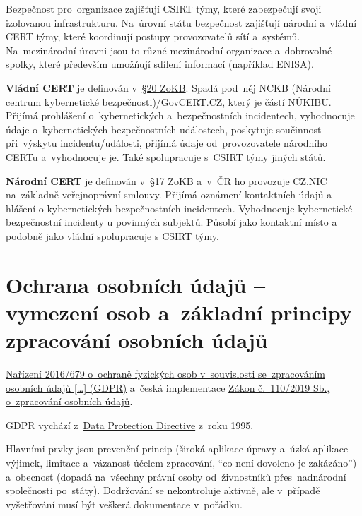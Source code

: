 Bezpečnost pro~organizace zajišťují CSIRT týmy, které zabezpečují svoji izolovanou infrastrukturu. Na~úrovní státu bezpečnost zajišťují národní a~vládní CERT týmy, které koordinují postupy provozovatelů sítí a~systémů. Na~mezinárodní úrovni jsou to různé mezinárodní organizace a~dobrovolné spolky, které především umožňují sdílení informací (například ENISA).

\textbf{Vládní CERT} je definován v~\href{https://www.zakonyprolidi.cz/cs/2014-181#p20}{§20 ZoKB}. Spadá pod~něj NCKB (Národní centrum kybernetické bezpečnosti)/GovCERT.CZ, který je částí NÚKIBU. Přijímá prohlášení o~kybernetických a~bezpečnostních incidentech, vyhodnocuje údaje o~kybernetických bezpečnostních událostech, poskytuje součinnost při~výskytu incidentu/události, přijímá údaje od~provozovatele národního CERTu a~vyhodnocuje je. Také spolupracuje s~CSIRT týmy jiných států.

\textbf{Národní CERT} je definován v~\href{https://www.zakonyprolidi.cz/cs/2014-181#p17}{§17 ZoKB} a~v~ČR ho provozuje CZ.NIC na~základně veřejnoprávní smlouvy. Přijímá oznámení kontaktních údajů a hlášení o kybernetických bezpečnostních incidentech. Vyhodnocuje kybernetické bezpečnostní incidenty u povinných subjektů. Působí jako kontaktní místo a podobně jako vládní spolupracuje s CSIRT týmy.







\clearpage
\section{Ochrana osobních údajů -- vymezení osob a~základní principy zpracování osobních údajů}

\href{https://eur-lex.europa.eu/legal-content/CS/TXT/HTML/?uri=CELEX:32016R0679}{Nařízení 2016/679 o~ochraně fyzických osob v~souvislosti se~zpracováním osobních údajů [\dots] (GDPR)} a~česká implementace
\href{https://www.zakonyprolidi.cz/cs/2019-110}{Zákon č.~110/2019 Sb., o~zpracování osobních údajů}.

GDPR vychází z~\href{https://eur-lex.europa.eu/legal-content/cs/TXT/HTML/?uri=CELEX:31995L0046}{Data Protection Directive} z~roku 1995.

Hlavními prvky jsou prevenční princip (široká aplikace úpravy a~úzká aplikace výjimek, limitace a~vázanost účelem zpracování, \enquote{co není dovoleno je zakázáno}) a~obecnost (dopadá na~všechny právní osoby od~živnostníků přes~nadnárodní společnosti po~státy). Dodržování se nekontroluje aktivně, ale v~případě vyšetřování musí být veškerá dokumentace v~pořádku.

